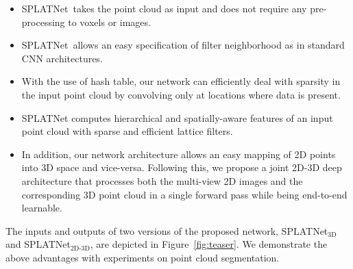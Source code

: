 \documentclass[10pt,twocolumn,letterpaper]{article}
\def\model{SPLATNet\xspace}
\newcommand{\camreadycomment}[1]{{\textcolor{red}{#1}}}
\begin{document}
\vspace{-1mm}\begin{itemize}
    \setlength\itemsep{0em}
    \item \model~takes the point cloud as input and does not require any pre-processing to voxels or images.
    \item \model~allows an easy specification of filter neighborhood as in standard CNN architectures.
    \item With the use of hash table, our network can efficiently deal with sparsity in the input point cloud by convolving  only at locations where data is present.
    \item SPLATNet computes hierarchical and spatially-aware features of an input point cloud with sparse
    and efficient lattice filters.
    \item In addition, our network architecture allows an easy mapping of 2D points into 3D space and vice-versa. Following this,
    we propose a joint 2D-3D deep architecture that processes both the multi-view 2D images and the corresponding 3D point cloud in a single forward pass while being end-to-end learnable.
\end{itemize}\vspace{-1mm}%
The inputs and outputs of two versions of the proposed network, SPLATNet$_{\text{3D}}$ and SPLATNet$_{\text{2D-3D}}$, 
are depicted in Figure~\ref{fig:teaser}.
We demonstrate the above advantages with experiments on point cloud segmentation. 
\end{document}
